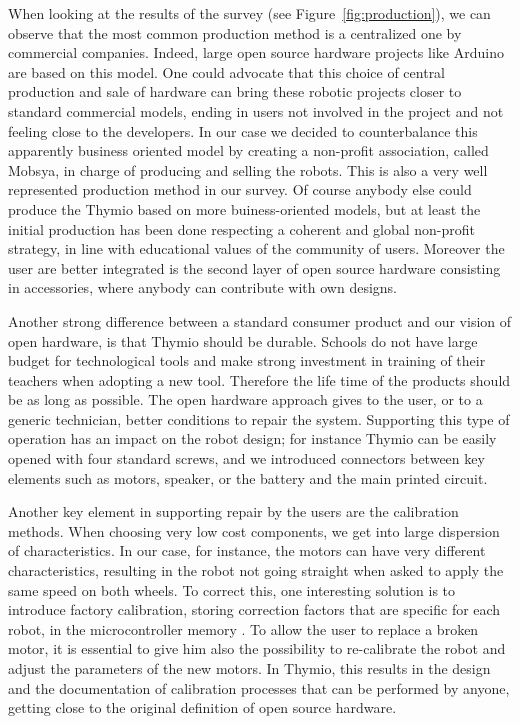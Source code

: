\documentclass[letterpaper, 10 pt, conference]{ieeeconf}  %
\begin{document}
When looking at the results of the survey (see Figure~\ref{fig:production}), we can observe that the most common production method is a centralized one by commercial companies.
Indeed, large open source hardware projects like Arduino are based on this model.
One could advocate that this choice of central production and sale of hardware can bring these robotic projects closer to standard commercial models, ending in users not involved in the project and not feeling close to the developers.
In our case we decided to counterbalance this apparently business oriented model by creating a non-profit association, called Mobsya, in charge of producing and selling the robots. 
This is also a very well represented production method in our survey.
Of course anybody else could produce the Thymio based on more buiness-oriented models, but at least the initial production has been done respecting a coherent and global non-profit strategy, in line with educational values of the community of users.
Moreover the user are better integrated is the second layer of open source hardware consisting in accessories, where anybody can contribute with own designs.

Another strong difference between a standard consumer product and our vision of open hardware, is that Thymio should be durable.
Schools do not have large budget for technological tools and make strong investment in training of their teachers when adopting a new tool.
Therefore the life time of the products should be as long as possible. 
The open hardware approach gives to the user, or to a generic technician, better conditions to repair the system.
Supporting this type of operation has an impact on the robot design; for instance Thymio can be easily opened with four standard screws, and we introduced connectors between key elements such as motors, speaker, or the battery and the main printed circuit. 

Another key element in supporting repair by the users are the calibration methods. 
When choosing very low cost components, we get into large dispersion of characteristics. 
In our case, for instance, the motors can have very different characteristics, resulting in the robot not going straight when asked to apply the same speed on both wheels. 
To correct this, one interesting solution is to introduce factory calibration, storing correction factors that are specific for each robot, in the microcontroller memory . 
To allow the user to replace a broken motor, it is essential to give him also the possibility to re-calibrate the robot and adjust the parameters of the new motors.
In Thymio, this results in the design and the documentation of calibration processes that can be performed by anyone, getting close to the original definition of open source hardware.
\end{document}
